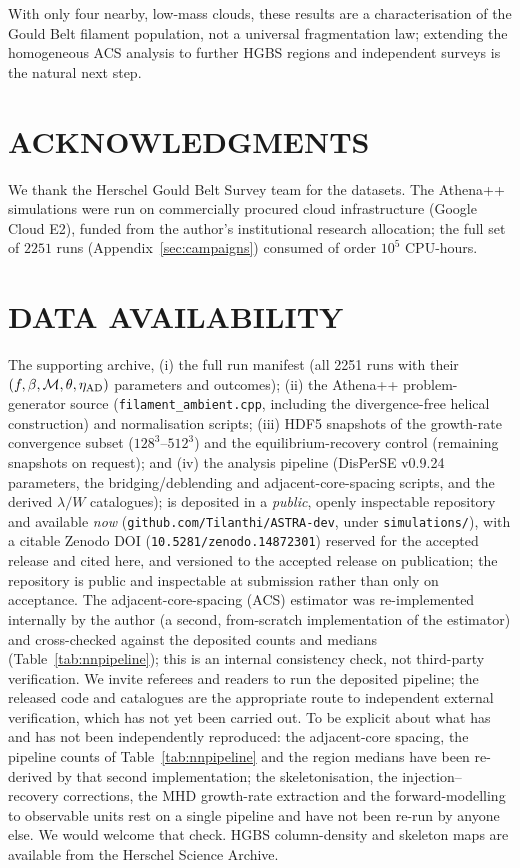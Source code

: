 \documentclass[usenatbib,twoside,twocolumn]{mnras}
\begin{document}
\smallskip\noindent With only four nearby, low-mass clouds, these results are a characterisation of the Gould Belt filament population, not a universal fragmentation law; extending the homogeneous ACS analysis to further HGBS regions and independent surveys is the natural next step.

\section*{ACKNOWLEDGMENTS}

We thank the Herschel Gould Belt Survey team for the datasets. The Athena++ simulations were run on commercially procured cloud infrastructure (Google Cloud E2), funded from the author's institutional research allocation; the full set of $2251$ runs (Appendix~\ref{sec:campaigns}) consumed of order $10^5$ CPU-hours.

\section*{DATA AVAILABILITY}

The supporting archive, (i) the full run manifest (all 2251 runs with their $(f,\beta,\mathcal{M},\theta,\eta_{\rm AD})$ parameters and outcomes); (ii) the Athena++ problem-generator source (\texttt{filament\_ambient.cpp}, including the divergence-free helical construction) and normalisation scripts; (iii) HDF5 snapshots of the growth-rate convergence subset ($128^3$--$512^3$) and the equilibrium-recovery control (remaining snapshots on request); and (iv) the analysis pipeline (DisPerSE v0.9.24 parameters, the bridging/deblending and adjacent-core-spacing scripts, and the derived $\lambda/W$ catalogues); is deposited in a \emph{public}, openly inspectable repository and available \emph{now} (\texttt{github.com/Tilanthi/ASTRA-dev}, under \texttt{simulations/}), with a citable Zenodo DOI (\texttt{10.5281/zenodo.14872301}) reserved for the accepted release and cited here, and versioned to the accepted release on publication; the repository is public and inspectable at submission rather than only on acceptance. The adjacent-core-spacing (ACS) estimator was re-implemented internally by the author (a second, from-scratch implementation of the estimator) and cross-checked against the deposited counts and medians (Table~\ref{tab:nnpipeline}); this is an internal consistency check, not third-party verification. We invite referees and readers to run the deposited pipeline; the released code and catalogues are the appropriate route to independent external verification, which has not yet been carried out. To be explicit about what has and has not been independently reproduced: the adjacent-core spacing, the pipeline counts of Table~\ref{tab:nnpipeline} and the region medians have been re-derived by that second implementation; the skeletonisation, the injection--recovery corrections, the MHD growth-rate extraction and the forward-modelling to observable units rest on a single pipeline and have not been re-run by anyone else. We would welcome that check. HGBS column-density and skeleton maps are available from the Herschel Science Archive.
\end{document}
